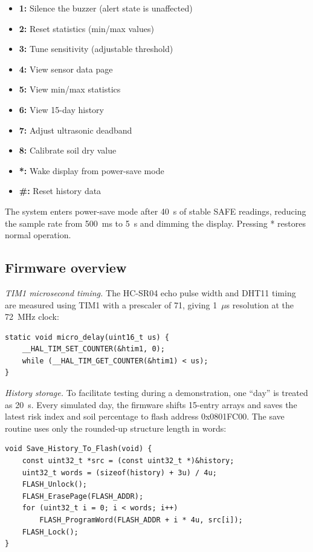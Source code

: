 \documentclass[5p,twocolumn]{elsarticle}
\begin{document}
\begin{itemize}[nosep]
  \item \textbf{1:} Silence the buzzer (alert state is unaffected)
  \item \textbf{2:} Reset statistics (min/max values)
  \item \textbf{3:} Tune sensitivity (adjustable threshold)
  \item \textbf{4:} View sensor data page
  \item \textbf{5:} View min/max statistics
  \item \textbf{6:} View 15-day history
  \item \textbf{7:} Adjust ultrasonic deadband
  \item \textbf{8:} Calibrate soil dry value
  \item \textbf{*:} Wake display from power-save mode
  \item \textbf{\#:} Reset history data
\end{itemize}

The system enters power-save mode after 40~s of stable SAFE readings, reducing the sample rate from 500~ms to 5~s and dimming the display. Pressing * restores normal operation.

\subsection{Firmware overview}

\textit{TIM1 microsecond timing.} The HC-SR04 echo pulse width and DHT11 timing are measured using TIM1 with a prescaler of 71, giving 1~$\mu$s resolution at the 72~MHz clock:

\begin{lstlisting}
static void micro_delay(uint16_t us) {
    __HAL_TIM_SET_COUNTER(&htim1, 0);
    while (__HAL_TIM_GET_COUNTER(&htim1) < us);
}
\end{lstlisting}

\textit{History storage.} To facilitate testing during a demonstration, one ``day'' is treated as 20~s. Every simulated day, the firmware shifts 15-entry arrays and saves the latest risk index and soil percentage to flash address 0x0801FC00. The save routine uses only the rounded-up structure length in words:

\begin{lstlisting}
void Save_History_To_Flash(void) {
    const uint32_t *src = (const uint32_t *)&history;
    uint32_t words = (sizeof(history) + 3u) / 4u;
    FLASH_Unlock();
    FLASH_ErasePage(FLASH_ADDR);
    for (uint32_t i = 0; i < words; i++)
        FLASH_ProgramWord(FLASH_ADDR + i * 4u, src[i]);
    FLASH_Lock();
}
\end{lstlisting}
\end{document}
